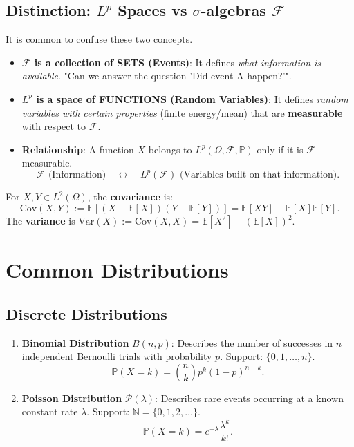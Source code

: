 \subsection{Distinction: \texorpdfstring{$L^p$}{Lp} Spaces vs \texorpdfstring{$\sigma$-}{sigma-}algebras \texorpdfstring{$\mathcal{F}$}{F}}
It is common to confuse these two concepts.
\begin{itemize}
    \item \textbf{$\mathcal{F}$ is a collection of SETS (Events)}: It defines \textit{what information is available}. "Can we answer the question 'Did event A happen?'".
    \item \textbf{$L^p$ is a space of FUNCTIONS (Random Variables)}: It defines \textit{random variables with certain properties} (finite energy/mean) that are \textbf{measurable} with respect to $\mathcal{F}$.
    \item \textbf{Relationship}: A function $X$ belongs to $L^p(\Omega, \mathcal{F}, \mathbb{P})$ only if it is $\mathcal{F}$-measurable.
    \[
    \mathcal{F} \text{ (Information)} \quad \leftrightarrow \quad L^p(\mathcal{F}) \text{ (Variables built on that information)}.
    \]
\end{itemize}

\begin{definition}
For $X, Y \in L^2(\Omega)$, the \textbf{covariance} is:
\[
\text{Cov}(X, Y) := \mathbb{E}[(X - \mathbb{E}[X])(Y - \mathbb{E}[Y])] = \mathbb{E}[XY] - \mathbb{E}[X]\mathbb{E}[Y].
\]
The \textbf{variance} is $\text{Var}(X) := \text{Cov}(X, X) = \mathbb{E}[X^2] - (\mathbb{E}[X])^2$.
\end{definition}

\section{Common Distributions}

\subsection{Discrete Distributions}
\begin{enumerate}
    \item \textbf{Binomial Distribution} $B(n, p)$:
    Describes the number of successes in $n$ independent Bernoulli trials with probability $p$.
    Support: $\{0, 1, \dots, n\}$.
    \[
    \mathbb{P}(X=k) = \binom{n}{k} p^k (1-p)^{n-k}.
    \]
    
    \item \textbf{Poisson Distribution} $\mathcal{P}(\lambda)$:
    Describes rare events occurring at a known constant rate $\lambda$.
    Support: $\mathbb{N} = \{0, 1, 2, \dots\}$.
    \[
    \mathbb{P}(X=k) = e^{-\lambda} \frac{\lambda^k}{k!}.
    \]
\end{enumerate}


